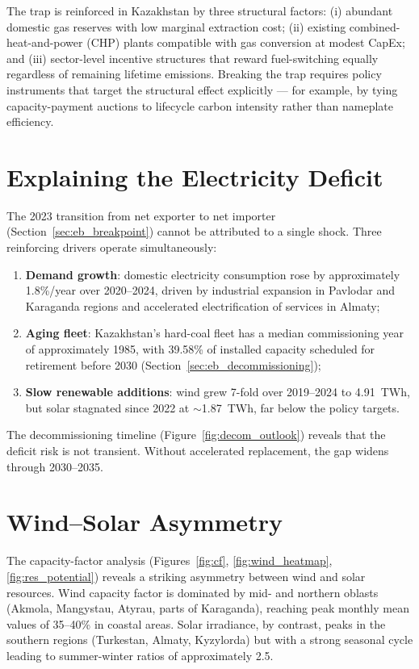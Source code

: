 The trap is reinforced in Kazakhstan by three structural factors: (i) abundant domestic gas reserves with low marginal extraction cost; (ii) existing combined-heat-and-power (CHP) plants compatible with gas conversion at modest CapEx; and (iii) sector-level incentive structures that reward fuel-switching equally regardless of remaining lifetime emissions. Breaking the trap requires policy instruments that target the structural effect explicitly --- for example, by tying capacity-payment auctions to lifecycle carbon intensity rather than nameplate efficiency.

\section{Explaining the Electricity Deficit}
\label{sec:disc_deficit}

The 2023 transition from net exporter to net importer (Section~\ref{sec:eb_breakpoint}) cannot be attributed to a single shock. Three reinforcing drivers operate simultaneously:
\begin{enumerate}
    \item \textbf{Demand growth}: domestic electricity consumption rose by approximately 1.8\%/year over 2020--2024, driven by industrial expansion in Pavlodar and Karaganda regions and accelerated electrification of services in Almaty;
    \item \textbf{Aging fleet}: Kazakhstan's hard-coal fleet has a median commissioning year of approximately 1985, with 39.58\% of installed capacity scheduled for retirement before 2030 (Section~\ref{sec:eb_decommissioning});
    \item \textbf{Slow renewable additions}: wind grew 7-fold over 2019--2024 to 4.91~TWh, but solar stagnated since 2022 at $\sim$1.87~TWh, far below the policy targets.
\end{enumerate}

The decommissioning timeline (Figure~\ref{fig:decom_outlook}) reveals that the deficit risk is not transient. Without accelerated replacement, the gap widens through 2030--2035.

\section{Wind--Solar Asymmetry}
\label{sec:disc_wind_solar}

The capacity-factor analysis (Figures~\ref{fig:cf}, \ref{fig:wind_heatmap}, \ref{fig:res_potential}) reveals a striking asymmetry between wind and solar resources. Wind capacity factor is dominated by mid- and northern oblasts (Akmola, Mangystau, Atyrau, parts of Karaganda), reaching peak monthly mean values of 35--40\% in coastal areas. Solar irradiance, by contrast, peaks in the southern regions (Turkestan, Almaty, Kyzylorda) but with a strong seasonal cycle leading to summer-winter ratios of approximately 2.5.

